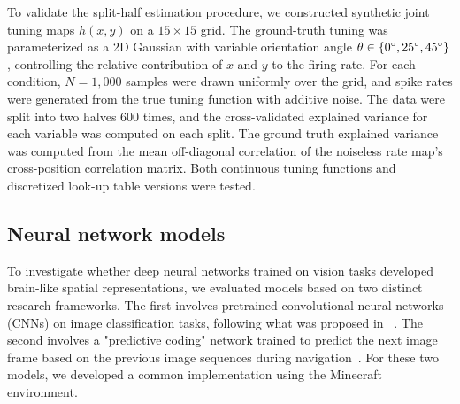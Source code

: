 \documentclass[11pt]{article}
\begin{document}
To validate the split-half estimation procedure, we constructed synthetic joint tuning maps $h(x, y)$ on a $15 \times 15$ grid. The ground-truth tuning was parameterized as a 2D Gaussian with variable orientation angle $\theta \in \{0\degree, 25\degree, 45\degree\}$, controlling the relative contribution of $x$ and $y$ to the firing rate. For each condition, $N = 1{,}000$ samples were drawn uniformly over the grid, and spike rates were generated from the true tuning function with additive noise. The data were split into two halves 600 times, and the cross-validated explained variance for each variable was computed on each split. The ground truth explained variance was computed from the mean off-diagonal correlation of the noiseless rate map's cross-position correlation matrix. Both continuous tuning functions and discretized look-up table versions were tested.





\subsection{Neural network models}

To investigate whether deep neural networks trained on vision tasks developed brain-like spatial representations, we evaluated models based on two distinct research frameworks. The first involves pretrained convolutional neural networks (CNNs) on image classification tasks, following what was proposed in ~\cite{Luo2024}. The second involves a "predictive coding" network trained to predict the next image frame based on the previous image sequences during navigation~\cite{Gornet2024}. For these two models, we developed a common implementation using the Minecraft environment. 
\end{document}
